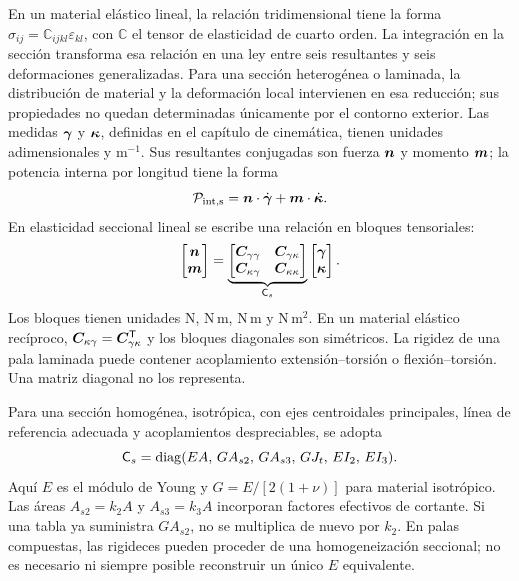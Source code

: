 En un material elástico lineal, la relación tridimensional tiene la forma $\sigma_{ij}=\mathbb C_{ijkl}\varepsilon_{kl}$, con $\mathbb C$ el tensor de elasticidad de cuarto orden. La integración en la sección transforma esa relación en una ley entre seis resultantes y seis deformaciones generalizadas. Para una sección heterogénea o laminada, la distribución de material y la deformación local intervienen en esa reducción; sus propiedades no quedan determinadas únicamente por el contorno exterior.
Las medidas $\bm{\gamma}$ y $\bm{\kappa}$, definidas en el capítulo de cinemática, tienen unidades adimensionales y $\mathrm{m^{-1}}$. Sus resultantes conjugadas son fuerza $\bm{n}$ y momento $\bm{m}$; la potencia interna por longitud tiene la forma
\begin{equation}
 \mathcal P_{\rm int,s}=\bm{n}\cdot\dot{\bm{\gamma}}+\bm{m}\cdot\dot{\bm{\kappa}}.
\end{equation}
En elasticidad seccional lineal se escribe una relación en bloques tensoriales:
\begin{equation}
 \begin{bmatrix}\bm{n}\\\bm{m}\end{bmatrix}=
 \underbrace{\begin{bmatrix}
 \boldsymbol{C}_{\gamma\gamma}&\boldsymbol{C}_{\gamma\kappa}\\
 \boldsymbol{C}_{\kappa\gamma}&\boldsymbol{C}_{\kappa\kappa}
 \end{bmatrix}}_{\mathsf C_s}
 \begin{bmatrix}\bm{\gamma}\\\bm{\kappa}\end{bmatrix}.
 \label{eq:Csection}
\end{equation}
Los bloques tienen unidades $\mathrm N$, $\mathrm{N\,m}$, $\mathrm{N\,m}$ y $\mathrm{N\,m^2}$. En un material elástico recíproco, $\boldsymbol{C}_{\kappa\gamma}=\boldsymbol{C}_{\gamma\kappa}^\mathsf T$ y los bloques diagonales son simétricos. La rigidez de una pala laminada puede contener acoplamiento extensión--torsión o flexión--torsión. Una matriz diagonal no los representa.

Para una sección homogénea, isotrópica, con ejes centroidales principales, línea de referencia adecuada y acoplamientos despreciables, se adopta
\begin{equation}
 \mathsf C_s=\operatorname{diag}(EA,\,G A_{s2},\,G A_{s3},\,GJ_t,\,EI_2,\,EI_3).
\end{equation}
Aquí $E$ es el módulo de Young y $G=E/[2(1+\nu)]$ para material isotrópico. Las áreas $A_{s2}=k_2A$ y $A_{s3}=k_3A$ incorporan factores efectivos de cortante. Si una tabla ya suministra $GA_{s2}$, no se multiplica de nuevo por $k_2$. En palas compuestas, las rigideces pueden proceder de una homogeneización seccional; no es necesario ni siempre posible reconstruir un único $E$ equivalente.

